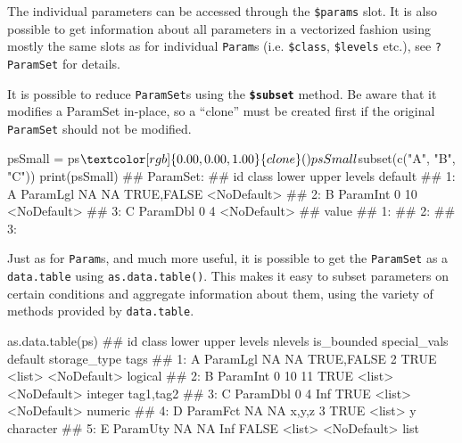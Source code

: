 \documentclass[12pt,]{scrbook}
\newenvironment{Shaded}{}{}
\newcommand{\KeywordTok}[1]{\textcolor[rgb]{0.00,0.00,1.00}{#1}}
\newcommand{\NormalTok}[1]{#1}
\newcommand{\OperatorTok}[1]{#1}
\newcommand{\StringTok}[1]{\textcolor[rgb]{0.00,0.50,0.50}{#1}}
\begin{document}
The individual parameters can be accessed through the \texttt{\$params} slot.
It is also possible to get information about all parameters in a vectorized fashion using mostly the same slots as for individual \texttt{Param}s (i.e. \texttt{\$class}, \texttt{\$levels} etc.), see \texttt{?ParamSet} for details.

It is possible to reduce \texttt{ParamSet}s using the \textbf{\texttt{\$subset}} method.
Be aware that it modifies a ParamSet in-place, so a ``clone'' must be created first if the original \texttt{ParamSet} should not be modified.

\begin{Shaded}
\begin{Highlighting}[]
\NormalTok{psSmall =}\StringTok{ }\NormalTok{ps}\OperatorTok{$}\KeywordTok{clone}\NormalTok{()}
\NormalTok{psSmall}\OperatorTok{$}\KeywordTok{subset}\NormalTok{(}\KeywordTok{c}\NormalTok{(}\StringTok{"A"}\NormalTok{, }\StringTok{"B"}\NormalTok{, }\StringTok{"C"}\NormalTok{))}
\KeywordTok{print}\NormalTok{(psSmall)}
\NormalTok{## ParamSet: }
\NormalTok{##    id    class lower upper      levels     default}
\NormalTok{## 1:  A ParamLgl    NA    NA  TRUE,FALSE <NoDefault>}
\NormalTok{## 2:  B ParamInt     0    10             <NoDefault>}
\NormalTok{## 3:  C ParamDbl     0     4             <NoDefault>}
\NormalTok{##    value}
\NormalTok{## 1:      }
\NormalTok{## 2:      }
\NormalTok{## 3:}
\end{Highlighting}
\end{Shaded}

Just as for \texttt{Param}s, and much more useful, it is possible to get the \texttt{ParamSet} as a \texttt{data.table} using \texttt{as.data.table()}.
This makes it easy to subset parameters on certain conditions and aggregate information about them, using the variety of methods provided by \texttt{data.table}.

\begin{Shaded}
\begin{Highlighting}[]
\KeywordTok{as.data.table}\NormalTok{(ps)}
\NormalTok{##    id    class lower upper      levels nlevels is_bounded special_vals     default storage_type      tags}
\NormalTok{## 1:  A ParamLgl    NA    NA  TRUE,FALSE       2       TRUE       <list> <NoDefault>      logical          }
\NormalTok{## 2:  B ParamInt     0    10                  11       TRUE       <list> <NoDefault>      integer tag1,tag2}
\NormalTok{## 3:  C ParamDbl     0     4                 Inf       TRUE       <list> <NoDefault>      numeric          }
\NormalTok{## 4:  D ParamFct    NA    NA       x,y,z       3       TRUE       <list>           y    character          }
\NormalTok{## 5:  E ParamUty    NA    NA                 Inf      FALSE       <list> <NoDefault>         list}
\end{Highlighting}
\end{Shaded}
\end{document}
